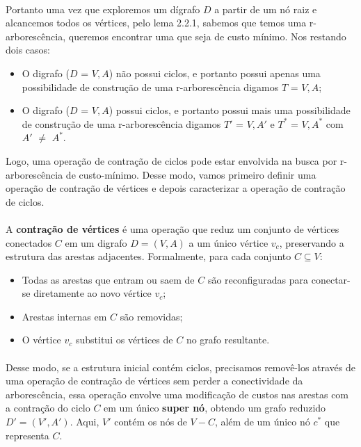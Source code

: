 \documentclass[12pt,a4paper]{article}
\begin{document}
\paragraph{}
Portanto uma vez que exploremos um dígrafo \(D\) a partir de um nó raiz e alcancemos todos os vértices, pelo lema 2.2.1, sabemos que temos uma r-arborescência, queremos encontrar uma que seja de custo mínimo. Nos restando dois casos:

\begin{itemize}
    \item O digrafo (\( D \) = \( V, A \)) não possui ciclos, e portanto possui apenas uma possibilidade de construção de uma r-arborescência digamos \( T \) = \( V, A \);
    \item O digrafo (\( D \) = \( V, A \)) possui ciclos, e portanto possui mais uma possibilidade de construção de uma r-arborescência digamos \( T' \) = \( V, A' \) e \( T^* \) = \( V, A^* \) com \(A' \) \(\neq\) \(A^* \).

\end{itemize}
Logo, uma operação de contração de ciclos pode estar envolvida na busca por r-arborescência de custo-mínimo. Desse modo, vamos primeiro definir uma operação de contração de vértices e depois caracterizar a operação de contração de ciclos.

\paragraph{}
A \textbf{contração de vértices} é uma operação que reduz um conjunto de vértices conectados \(C\) em um digrafo \(D = (V, A)\) a um único vértice \(v_c\), preservando a estrutura das arestas adjacentes. Formalmente, para cada conjunto \(C \subseteq V\):
\begin{itemize}
    \item Todas as arestas que entram ou saem de \(C\) são reconfiguradas para conectar-se diretamente ao novo vértice \(v_c\);
    \item Arestas internas em \(C\) são removidas;
    \item O vértice \(v_c\) substitui os vértices de \(C\) no grafo resultante.
\end{itemize}

\paragraph{}
Desse modo, se a estrutura inicial contém ciclos, precisamos removê-los através de uma operação de contração de vértices sem perder a conectividade da arborescência, essa operação envolve uma modificação de custos nas arestas com a contração do ciclo \( C \) em um único \textbf{super nó}, obtendo um grafo reduzido \( D' = (V', A') \). Aqui, \( V' \) contém os nós de \( V - C \), além de um único nó \( c^* \) que representa \( C \).
\end{document}
